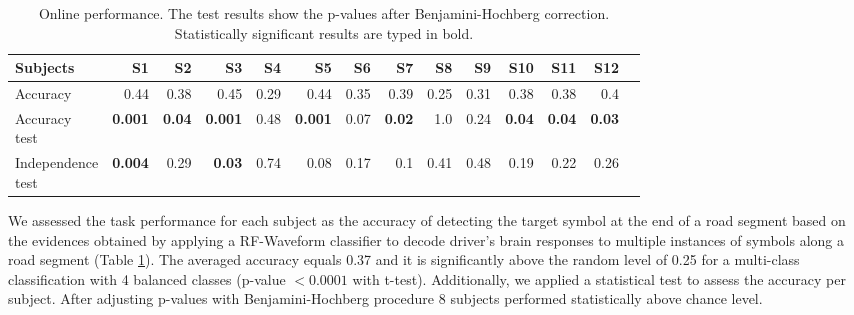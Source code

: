 \documentclass[12pt]{iopart}
\begin{document}
\begin{table}
    \centering
    \caption{Online performance. The test results show the p-values after Benjamini-Hochberg correction.
    Statistically significant results are typed in bold.}
    \scriptsize
    \renewcommand{\arraystretch}{1.5}
    \begin{tabular}{l r r r r r r r r r r r r r}
        \hline
        Subjects & S1 & S2 & S3 & S4 & S5 & S6 & S7 & S8 & S9 & S10 & S11 & S12 \\
        \hline

        Accuracy & 0.44 & 0.38 & 0.45 & 0.29 & 0.44 & 0.35 & 0.39 & 0.25 & 0.31 & 0.38 & 0.38 & 0.4 \\ 
        \shortstack{Accuracy \\ test} & \textbf{0.001} & \textbf{0.04} & \textbf{0.001}
        & 0.48 & \textbf{0.001} & 0.07 & \textbf{0.02} & 1.0 & 0.24 & \textbf{0.04} & \textbf{0.04} & \textbf{0.03} \\
        \shortstack{Independence \\ test}  & \textbf{0.004} & 0.29 & \textbf{0.03} & 0.74
        & 0.08 & 0.17 & 0.1 & 0.41 & 0.48 & 0.19 & 0.22 & 0.26 \\
        \hline
    \end{tabular}
    \label{tab:onlineperf}
\end{table}

We assessed the task performance for each subject as the accuracy of
detecting the target symbol at the end of a road segment based on the evidences obtained by applying a RF-Waveform classifier
to decode driver’s brain responses to multiple instances of symbols along a road segment (Table \ref{tab:onlineperf}).
The averaged accuracy 
equals 0.37 and it is significantly above the random level of 0.25 for
a multi-class classification with 4 balanced classes (p-value $< 0.0001$ with t-test).
Additionally, we applied a statistical test to assess the accuracy per subject.
After adjusting p-values with Benjamini-Hochberg procedure 8 subjects performed statistically above chance level.
\end{document}

